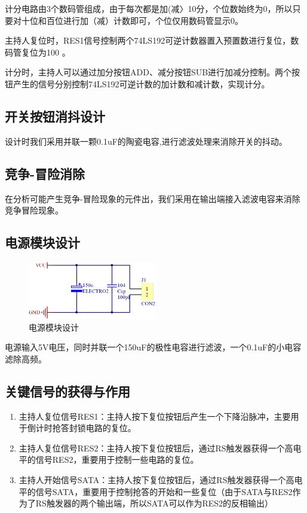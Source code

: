 \documentclass{../source/Experiment}
\begin{document}
        计分电路由3个数码管组成，由于每次都是加(减〉10分，个位数始终为0，所以只要对十位和百位进行加（减）计数即可，个位仅用数码管显示0。

        主持人复位时，RES1信号控制两个74LS192可逆计数器置入预置数进行复位，数码管复位为100 。

        计分时，主持人可以通过加分按钮ADD、减分按钮SUB进行加减分控制。两个按钮产生的信号分别控制74LS192可逆计数的加计数和减计数，实现计分。


        \subsection{开关按钮消抖设计}
        设计时我们采用并联一颗0.1uF的陶瓷电容,进行滤波处理来消除开关的抖动。
        \subsection{竞争-冒险消除}
        在分析可能产生竞争-冒险现象的元件出，我们采用在输出端接入滤波电容来消除竞争冒险现象。
        \subsection{电源模块设计}
                \begin{figure}[H]
                    \centering
                    \includegraphics[width = 0.5\textwidth]{pic/source.png}
                    \caption{电源模块设计}
                \end{figure}
            电源输入5V电压，同时并联一个150uF的极性电容进行滤波，一个0.1uF的小电容滤除高频。
        \subsection{关键信号的获得与作用}
            \begin{enumerate}
                \item 主持人复位信号RES1：主持人按下复位按钮后产生一个下降沿脉冲，主要用于倒计时抢答封锁电路的复位。
                \item 主持人复位信号RES2：主持人按下复位按钮后，通过RS触发器获得一个高电平的信号RES2，重要用于控制一些电路的复位。
                \item 主持人开始信号SATA：主持人按下复位按钮后，通过RS触发器获得一个高电平的信号SATA，重要用于控制抢答的开始和一些复位（由于SATA与RES2作为了RS触发器的两个输出端，所以SATA可以作为RES2的反相输出）
            \end{enumerate}
\end{document}
